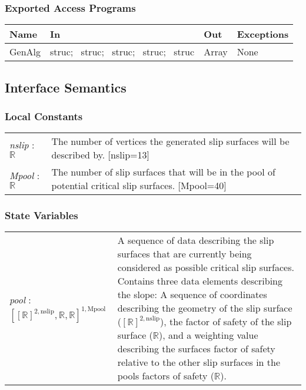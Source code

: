 \documentclass[12pt, titlepage]{article}
\begin{document}
\subsubsection{Exported Access Programs}
\begin{center}
\renewcommand*{\arraystretch}{1.5}
\begin{tabular}{| p{} | p{} | 
p{} | p{} |} \hline 

  \textbf{Name} & \textbf{In} & \textbf{Out} & \textbf{Exceptions}
  \\ \hline

  GenAlg & struc; ~\newline struc; ~\newline struc; ~\newline struc;
  ~\newline struc & Array & None \\ \hline
\end{tabular}
\end{center}

\subsection{Interface Semantics}

\subsubsection{Local Constants}
\renewcommand*{\arraystretch}{1.5}
\begin{longtable}{p{} p{}}
  \textit{nslip} : $\mathbb{R}$ & The number of vertices the generated
  slip surfaces will be described by. [nslip=13] \\

  \textit{Mpool} : $\mathbb{R}$ & The number of slip surfaces that
  will be in the pool of potential critical slip surfaces. [Mpool=40]
\end{longtable}

\subsubsection{State Variables}
\renewcommand*{\arraystretch}{1.5}
\begin{longtable}{p{} p{}}
  \textit{pool} : $[[\mathbb{R}]^{2,\text{nslip}}, \mathbb{R},
    \mathbb{R}]^{1,\text{Mpool}}$ & A sequence of data describing the
  slip surfaces that are currently being considered as possible
  critical slip surfaces. Contains three data elements describing the
  slope: A sequence of coordinates describing the geometry of the slip
  surface ($[\mathbb{R}]^{2,\text{nslip}}$), the factor of safety of
  the slip surface ($\mathbb{R}$), and a weighting value describing
  the surfaces factor of safety relative to the other slip surfaces in
  the pools factors of safety ($\mathbb{R}$). \\
\end{longtable}
\end{document}
